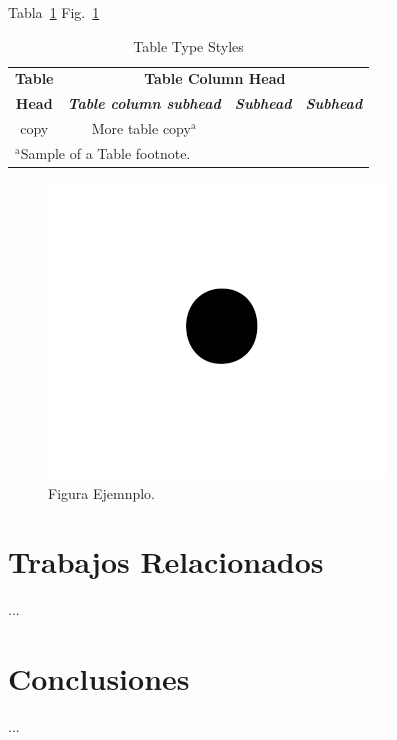 \documentclass[conference]{IEEEtran}
\begin{document}
Tabla~\ref{tab:1}
Fig.~\ref{fig:1}

\begin{table}[htbp]
    \caption{Table Type Styles}
    \begin{center}
        \begin{tabular}{|c|c|c|c|}
            \hline
            \textbf{Table} & \multicolumn{3}{|c|}{\textbf{Table Column Head}}                                                         \\
            \cline{2-4}
            \textbf{Head}  & \textbf{\textit{Table column subhead}}           & \textbf{\textit{Subhead}} & \textbf{\textit{Subhead}} \\
            \hline
            copy           & More table copy$^{\mathrm{a}}$                   &                           &                           \\
            \hline
            \multicolumn{4}{l}{$^{\mathrm{a}}$Sample of a Table footnote.}
        \end{tabular}
        \label{tab:1}
    \end{center}
\end{table}

\begin{figure}[htbp]
    \centerline{\includegraphics{Figures/fig1.png}}
    \caption{Figura Ejemnplo.}
    \label{fig:1}
\end{figure}


\section{Trabajos Relacionados}
\label{sec:TR}
...


\section{Conclusiones}
\label{sec:Conclusiones}
...



\end{document}
